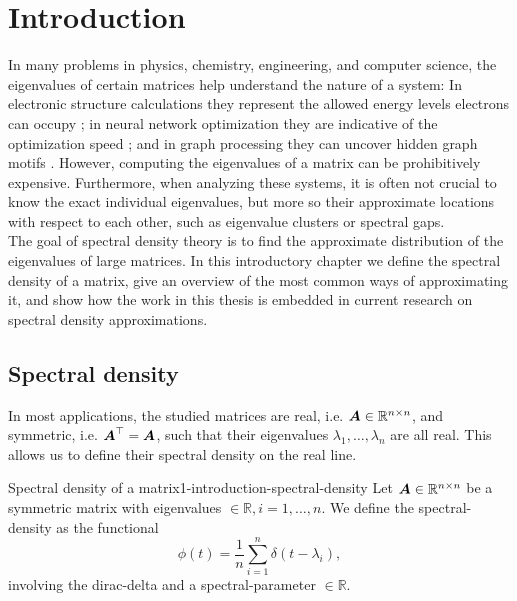 \chapter{Introduction}
\label{chp:1-introduction}

In many problems in physics, chemistry, engineering, and computer science, 
the eigenvalues of certain matrices help understand the nature of a system:
In electronic structure calculations they represent the allowed energy levels 
electrons can occupy \cite{ducastelle1970charge, haydock1972electronic, lin2017randomized};
in neural network optimization they are indicative of the optimization speed \cite{ghorbani2019investigation,chen2021slq,adepu2021hessian};
and in graph processing they can uncover hidden graph motifs \cite{kruzick2018graph,huang2021kernels,patane2022filter}.
However, computing the eigenvalues of a matrix can be prohibitively expensive.
Furthermore, when analyzing these systems, it is often not crucial to know the
exact individual eigenvalues, but more so their approximate locations with respect
to each other, such as eigenvalue clusters or spectral gaps.\\

The goal of spectral density theory is to find the approximate distribution of
the eigenvalues of large matrices. In this introductory chapter we define the
spectral density of a matrix, give an overview of the most common ways of
approximating it, and show how the work in this thesis is embedded in current
research on spectral density approximations.

\section{Spectral density}
\label{sec:1-introduction-spectral-density}

In most applications, the studied matrices are real,
i.e. $\boldsymbol{A} \in \mathbb{R}^{n \times n}$, and symmetric, i.e. $\boldsymbol{A}^{\top} = \boldsymbol{A}$,
such that their eigenvalues $\lambda_1, \dots, \lambda_n$ are all real.
This allows us to define their spectral density on the real line.
\begin{definition}{Spectral density of a matrix}{1-introduction-spectral-density}
    Let $\boldsymbol{A} \in \mathbb{R}^{n \times n}$ be a symmetric matrix with \glspl{eigenvalue}
    $\in \mathbb{R}, i=1, \dots, n$. We define the \gls{spectral-density} as
    the functional
    \begin{equation}
        \phi(t) = \frac{1}{n} \sum_{i=1}^{n} \delta(t - \lambda_i),
        \label{equ:1-introduction-def-spectral-density}
    \end{equation}
    involving the \gls{dirac-delta}
    and a \gls{spectral-parameter} $\in \mathbb{R}$.
\end{definition}

